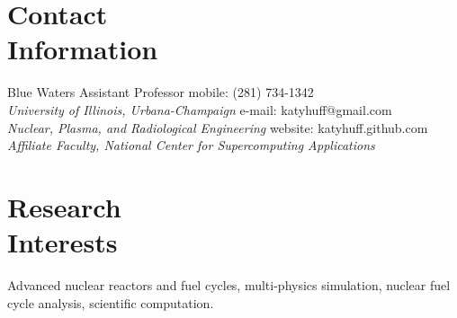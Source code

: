 \documentclass[margin,line]{resume}
\begin{document}
\begin{resume}

    \section{\mysidestyle Contact\\Information}
    Blue Waters Assistant Professor \hfill mobile: (281) 734-1342 \vspace{0mm}\\\vspace{0mm}%
        \textsl{University of Illinois, Urbana-Champaign}
        \hfill e-mail: katyhuff@gmail.com            \vspace{0mm}\\\vspace{0mm}%
    \textsl{Nuclear, Plasma, and Radiological Engineering}
        \hfill website: katyhuff.github.com     \vspace{0mm}\\\vspace{-4.5mm}%
    \textsl{Affiliate Faculty, National Center for Supercomputing Applications}           \vspace{0mm}\\\vspace{0mm}%

    \section{\mysidestyle Research\\Interests}
		Advanced nuclear reactors and fuel cycles, multi-physics
                simulation, nuclear fuel cycle analysis,
                scientific computation.

\end{resume}
\end{document}
